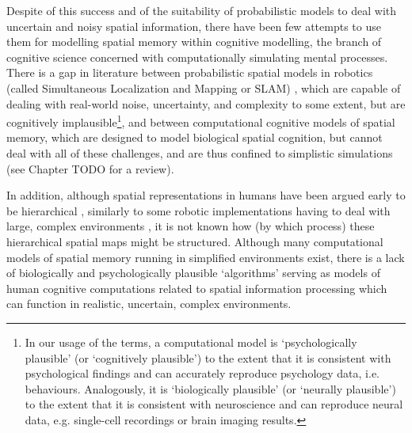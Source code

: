 Despite of this success and of the suitability of probabilistic models to deal with uncertain and noisy spatial information, there have been few attempts to use them for modelling spatial memory within cognitive modelling, the branch of cognitive science concerned with computationally simulating mental processes. There is a gap in literature between probabilistic spatial models in robotics (called Simultaneous Localization and Mapping or SLAM) \citep{thrun2008simultaneous}, which are capable of dealing with real-world noise, uncertainty, and complexity to some extent, but are cognitively implausible\footnote{In our usage of the terms, a computational model is `psychologically plausible' (or `cognitively plausible') to the extent that it is consistent with psychological findings and can accurately reproduce psychology data, i.e. behaviours. Analogously, it is `biologically plausible' (or `neurally plausible') to the extent that it is consistent with neuroscience and can reproduce neural data, e.g. single-cell recordings or brain imaging results.}, and between computational cognitive models of spatial memory, which are designed to model biological spatial cognition, but cannot deal with all of these challenges, and are thus confined to simplistic simulations (see Chapter TODO for a review). 


In addition, although spatial representations in humans have been argued early to be hierarchical \citep{hirtle1985evidence, mcnamara1989subjective, wiener2003fine}, similarly to some robotic implementations having to deal with large, complex environments \citep{kuipers2000spatial, wurm2010octomap}, it is not known how (by which process) these hierarchical spatial maps might be structured. Although many computational models of spatial memory running in simplified environments exist, there is a lack of biologically and psychologically plausible `algorithms' serving as models of human cognitive computations related to spatial information processing which can function in realistic, uncertain, complex environments.

